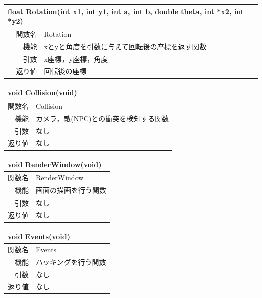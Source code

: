\documentclass{jarticle}
\begin{document}
\begin{table}[H]
\begin{tabular}{|r|l|}
\hline
\multicolumn{2}{|l|}{float Rotation(int x1, int y1, int a, int b, double theta, int *x2, int *y2)}       \\ \hline
関数名           & Rotation \\ \hline
機能     & xとyと角度を引数に与えて回転後の座標を返す関数 \\
引数     & x座標，y座標，角度 \\
返り値   & 回転後の座標 \\ \hline
\end{tabular}
\end{table}


\begin{table}[H]
\begin{tabular}{|r|l|}
\hline
\multicolumn{2}{|l|}{void Collision(void)}       \\ \hline
関数名           & Collision \\ \hline
  機能     & カメラ，敵(NPC)との衝突を検知する関数 \\
引数     & なし \\
返り値   & なし \\ \hline
\end{tabular}
\end{table}


\begin{table}[H]
\begin{tabular}{|r|l|}
\hline
\multicolumn{2}{|l|}{void RenderWindow(void)}       \\ \hline
関数名           & RenderWindow \\ \hline
機能     & 画面の描画を行う関数 \\
引数     & なし \\
返り値   & なし \\ \hline
\end{tabular}
\end{table}


\begin{table}[H]
\begin{tabular}{|r|l|}
\hline
\multicolumn{2}{|l|}{void Events(void)} \\ \hline
関数名           & Events \\ \hline
  機能     & ハッキングを行う関数 \\
引数     & なし \\
返り値   & なし \\ \hline
\end{tabular}
\end{table}
\end{document}
